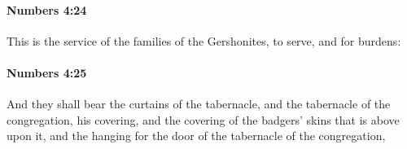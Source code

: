 		\paragraph{Numbers 4:24} %
			\label{NUMBERS-4-24}

			This is the service of the families of the Gershonites, to serve, and for burdens:


		\paragraph{Numbers 4:25} %
			\label{NUMBERS-4-25}

			And they shall bear the curtains of the tabernacle, and the tabernacle of the congregation, his covering, and the covering of the badgers’ skins that is above upon it, and the hanging for the door of the tabernacle of the congregation,


